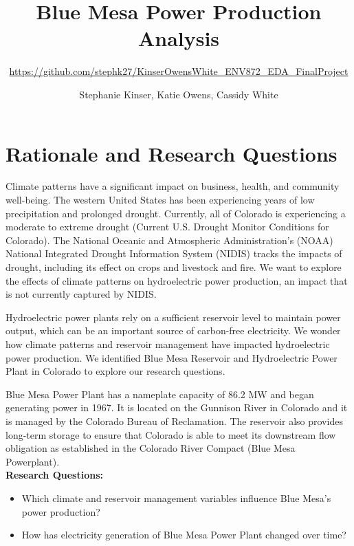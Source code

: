 \documentclass[
  12pt,
]{article}
\title{Blue Mesa Power Production Analysis}
\subtitle{\url{https://github.com/stephk27/KinserOwensWhite_ENV872_EDA_FinalProject}}
\author{Stephanie Kinser, Katie Owens, Cassidy White}
\date{}
\providecommand{\tightlist}{%
  \setlength{\itemsep}{0pt}\setlength{\parskip}{0pt}}
\begin{document}
\maketitle

\newpage
\tableofcontents 
\newpage
\listoftables 
\newpage
\listoffigures 
\newpage

\hypertarget{rationale-and-research-questions}{%
\section{Rationale and Research
Questions}\label{rationale-and-research-questions}}

Climate patterns have a significant impact on business, health, and
community well-being. The western United States has been experiencing
years of low precipitation and prolonged drought. Currently, all of
Colorado is experiencing a moderate to extreme drought (Current U.S.
Drought Monitor Conditions for Colorado). The National Oceanic and
Atmospheric Administration's (NOAA) National Integrated Drought
Information System (NIDIS) tracks the impacts of drought, including its
effect on crops and livestock and fire. We want to explore the effects
of climate patterns on hydroelectric power production, an impact that is
not currently captured by NIDIS.

Hydroelectric power plants rely on a sufficient reservoir level to
maintain power output, which can be an important source of carbon-free
electricity. We wonder how climate patterns and reservoir management
have impacted hydroelectric power production. We identified Blue Mesa
Reservoir and Hydroelectric Power Plant in Colorado to explore our
research questions.

Blue Mesa Power Plant has a nameplate capacity of 86.2 MW and began
generating power in 1967. It is located on the Gunnison River in
Colorado and it is managed by the Colorado Bureau of Reclamation. The
reservoir also provides long-term storage to ensure that Colorado is
able to meet its downstream flow obligation as established in the
Colorado River Compact (Blue Mesa Powerplant).\\

\textbf{Research Questions:}

\begin{itemize}
\tightlist
\item
  Which climate and reservoir management variables influence Blue Mesa's
  power production?\\
\item
  How has electricity generation of Blue Mesa Power Plant changed over
  time?
\end{itemize}
\end{document}
